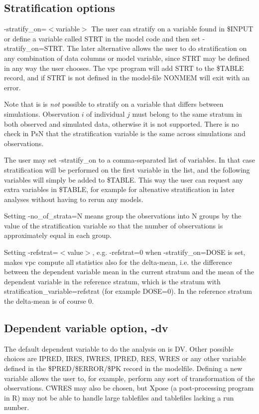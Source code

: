 \subsection{Stratification options}
-stratify\_on=$<$variable$>$ The user can stratify on a variable found in \$INPUT or define a variable called STRT in the model code and then set -stratify\_on=STRT. The later alternative allows the user to do stratification on any combination of data columns or model variable, since STRT may be defined in any way the user chooses. The vpc program will add STRT to the \$TABLE record, and if STRT is not defined in the model-file NONMEM will exit with an error. 

Note that is is
\emph{not} possible to stratify on a variable that differs between simulations. 
Observation $i$ of individual $j$ must belong to the same stratum in
both observed and simulated data, otherwise it is not supported. 
There is no check in PsN that the
stratification variable is the same across simulations and observations.

The user may set -stratify\_on to a comma-separated list of variables. In that case stratification will be performed on the first variable in the list, and the following variables will simply be added to \$TABLE. This way the user can request any extra variables in \$TABLE, for example for altenative stratification in later analyses without having to rerun any models.


Setting -no\_of\_strata=N means group the observations into N groups by the value of the stratification variable so that the number of observations is approximately equal in each group.

Setting -refstrat=$<$value$>$, e.g. -refstrat=0 when -stratify\_on=DOSE is set, makes vpc compute all statistics also for the delta-mean, i.e. the difference between the dependent variable mean in the current stratum and the mean of the dependent variable in the reference stratum, which is the stratum with stratification\_variable=refstrat (for example DOSE=0). In the reference stratum the delta-mean is of course 0.

\subsection{Dependent variable option, -dv}
The default dependent variable to do the analysis on is DV. Other possible choices are IPRED, IRES, IWRES, IPRED, RES, WRES or any other variable defined in the \$PRED/\$ERROR/\$PK record in the modelfile. Defining a new variable allows the user to, for example, perform any sort of transformation of the observations. CWRES may also be chosen, but Xpose (a post-processing program in R) may not be able to handle large tablefiles and tablefiles lacking a run number. 


